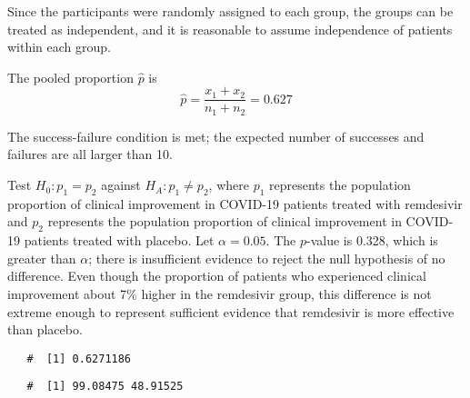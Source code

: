 \documentclass[letterpaper,12pt,twoside,]{pinp}
\begin{document}
\begin{enumerate}
\begin{enumerate}
    \color{blue}

    Since the participants were randomly assigned to each group, the
    groups can be treated as independent, and it is reasonable to assume
    independence of patients within each group.

    The pooled proportion \(\hat{p}\) is
    \[\hat{p} = \dfrac{x_1 + x_2}{n_1 + n_2} = 0.627\]

    The success-failure condition is met; the expected number of
    successes and failures are all larger than 10.

    Test \(H_0: p_1 = p_2\) against \(H_A: p_1 \neq p_2\), where \(p_1\)
    represents the population proportion of clinical improvement in
    COVID-19 patients treated with remdesivir and \(p_2\) represents the
    population proportion of clinical improvement in COVID-19 patients
    treated with placebo. Let \(\alpha = 0.05\). The \(p\)-value is
    0.328, which is greater than \(\alpha\); there is insufficient
    evidence to reject the null hypothesis of no difference. Even though
    the proportion of patients who experienced clinical improvement
    about 7\% higher in the remdesivir group, this difference is not
    extreme enough to represent sufficient evidence that remdesivir is
    more effective than placebo.

    \color{black}
  \end{enumerate}

\begin{Shaded}
\begin{Highlighting}[]
\StringTok{ }\OperatorTok{/}
\end{Highlighting}
\end{Shaded}

  \begin{ShadedResult}
   \begin{verbatim}
   #  [1] 0.6271186
   \end{verbatim}
   \end{ShadedResult}

\begin{Shaded}
\begin{Highlighting}[]
\OperatorTok{*}
\end{Highlighting}
\end{Shaded}

  \begin{ShadedResult}
   \begin{verbatim}
   #  [1] 99.08475 48.91525
   \end{verbatim}
   \end{ShadedResult}


\end{enumerate}
\end{document}

